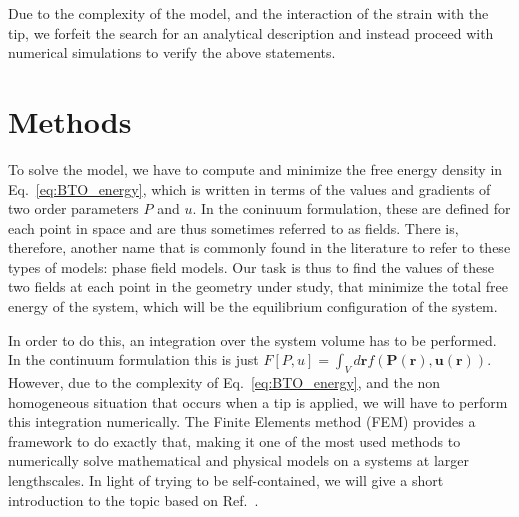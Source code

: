 Due to the complexity of the model, and the interaction of the strain with the tip, we forfeit the search for an analytical description and instead proceed with numerical simulations to verify the above statements.

\section{Methods}
To solve the model, we have to compute and minimize the free energy density in Eq.~\ref{eq:BTO_energy}, which is written in terms of the values and gradients of two order parameters $P$ and $u$.
In the coninuum formulation, these are defined for each point in space and are thus sometimes referred to as fields.
There is, therefore, another name that is commonly found in the literature to refer to these types of models: phase field models.
Our task is thus to find the values of these two fields at each point in the geometry under study, that minimize the total free energy of the system, which will be the equilibrium configuration of the system.

In order to do this, an integration over the system volume has to be performed. In the continuum formulation this is just $F[P,u]=\int_V d\bm{r} f(\bm{P}(\bm{r}),\bm{u}(\bm{r}))$.
However, due to the complexity of Eq.~\ref{eq:BTO_energy}, and the non homogeneous situation that occurs when a tip is applied, we will have to perform this integration numerically.
The Finite Elements method (FEM) provides a framework to do exactly that, making it one of the most used methods to numerically solve mathematical and physical models on a systems at larger lengthscales.
In light of trying to be self-contained, we will give a short introduction to the topic based on Ref.~\cite{Biner}.

